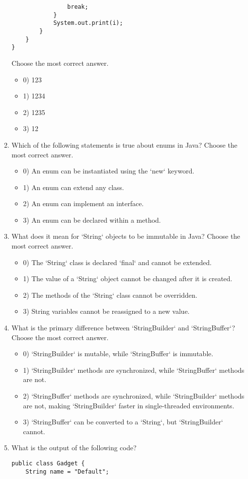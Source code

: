 \documentclass[12pt]{article}
\begin{document}
\begin{enumerate}[label=(\arabic*)]
\begin{verbatim}
                break;
            }
            System.out.print(i);
        }
    }
}
\end{verbatim}
Choose the most correct answer. 
\begin{itemize}
\item 0) 123
\item 1) 1234
\item 2) 1235
\item 3) 12
\end{itemize}
\item Which of the following statements is true about enums in Java?
Choose the most correct answer. 
\begin{itemize}
\item 0) An enum can be instantiated using the `new` keyword.
\item 1) An enum can extend any class.
\item 2) An enum can implement an interface.
\item 3) An enum can be declared within a method.
\end{itemize}
\item What does it mean for `String` objects to be immutable in Java?
Choose the most correct answer. 
\begin{itemize}
\item 0) The `String` class is declared `final` and cannot be extended.
\item 1) The value of a `String` object cannot be changed after it is created.
\item 2) The methods of the `String` class cannot be overridden.
\item 3) String variables cannot be reassigned to a new value.
\end{itemize}
\item What is the primary difference between `StringBuilder` and `StringBuffer`?
Choose the most correct answer. 
\begin{itemize}
\item 0) `StringBuilder` is mutable, while `StringBuffer` is immutable.
\item 1) `StringBuilder` methods are synchronized, while `StringBuffer` methods are not.
\item 2) `StringBuffer` methods are synchronized, while `StringBuilder` methods are not, making `StringBuilder` faster in single-threaded environments.
\item 3) `StringBuffer` can be converted to a `String`, but `StringBuilder` cannot.
\end{itemize}
\item What is the output of the following code?\n\begin{verbatim}
public class Gadget {
    String name = "Default";


\end{verbatim}
\end{enumerate}
\end{document}
